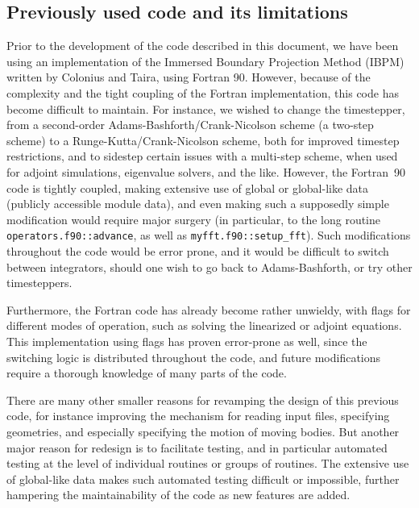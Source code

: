 \documentclass[11pt]{article}
\begin{document}
\subsection{Previously used code and its limitations}
Prior to the development of the code described in this document, we have been using an implementation of the Immersed Boundary Projection Method (IBPM) written by Colonius and Taira, using Fortran 90.  However, because of the complexity and the tight coupling of the Fortran implementation, this code has become difficult to maintain.  For instance, we wished to change the timestepper, from a second-order Adams-Bashforth/Crank-Nicolson scheme (a two-step scheme) to a Runge-Kutta/Crank-Nicolson scheme, both for improved timestep restrictions, and to sidestep certain issues with a multi-step scheme, when used for adjoint simulations, eigenvalue solvers, and the like.  However, the Fortran~90 code is tightly coupled, making extensive use of global or global-like data (publicly accessible module data), and even making such a supposedly simple modification would require major surgery (in particular, to the long routine {\tt operators.f90::advance}, as well as {\tt myfft.f90::setup\_fft}).  Such modifications throughout the code would be error prone, and it would be difficult to switch between integrators, should one wish to go back to Adams-Bashforth, or try other timesteppers.  

Furthermore, the Fortran code has already become rather unwieldy, with flags for different modes of operation, such as solving the linearized or adjoint equations.  This implementation using flags has proven error-prone as well, since the switching logic is distributed throughout the code, and future modifications require a thorough knowledge of many parts of the code.

There are many other smaller reasons for revamping the design of this previous code, for instance improving the mechanism for reading input files, specifying geometries, and especially specifying the motion of moving bodies.  But another major reason for redesign is to facilitate testing, and in particular automated testing at the level of individual routines or groups of routines.  The extensive use of global-like data makes such automated testing difficult or impossible, further hampering the maintainability of the code as new features are added.
\end{document}
